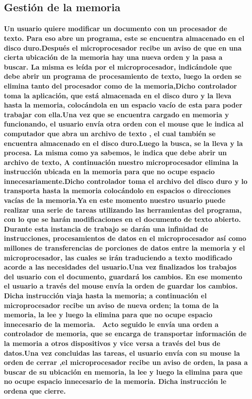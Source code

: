 \documentclass{article}
\begin{document}
\subsection{Gestión de la memoria}

\paragraph{Un usuario quiere modificar un documento con un procesador de texto. Para eso abre
un programa, este se encuentra almacenado en el disco duro.Después el microprocesador recibe un aviso de que en una cierta ubicación de la memoria hay una nueva orden y la pasa a buscar. La misma es leída por el microprocesador, indicándole que debe abrir un programa de procesamiento de texto, luego la orden se elimina tanto del procesador como de la memoria,Dicho controlador toma la aplicación, que está almacenada en el disco duro y la lleva hasta la memoria, colocándola en un espacio
vacío de esta para poder trabajar con ella.Una vez que se encuentra cargado en memoria y
funcionando, el usuario envía otra orden con el mouse que le indica al computador que abra
un archivo de texto , el cual también se encuentra almacenado en el disco duro.Luego la busca, se la lleva y la procesa. La misma como ya sabemos, le indica que debe abrir un archivo de texto, A continuación nuestro microprocesador elimina la instrucción ubicada en la memoria para
que no ocupe espacio innecesariamente.Dicho controlador toma el archivo del disco duro y lo transporta hasta la memoria colocándolo en espacios o direcciones vacías de la memoria.Ya en este momento nuestro usuario puede realizar una serie de tareas utilizando las
herramientas del programa, con lo que se harán modificaciones en el documento de
texto abierto. Durante esta instancia de trabajo se darán una infinidad de instrucciones,
procesamientos de datos en el microprocesador así como millones de transferencias de
porciones de datos entre la memoria y el microprocesador, las cuales se irán traduciendo a
texto modificado acorde a las necesidades del usuario.Una vez finalizados los trabajos del usuario con el documento, guardará los cambios. En ese
momento el usuario a través del mouse envía la orden de guardar los cambios. Dicha
instrucción viaja hasta la memoria; a continuación el microprocesador recibe un aviso de
nueva orden; la toma de la memoria, la lee y luego la elimina para que no ocupe espacio
innecesario de la memoria.
 Acto seguido le envía una orden a controlador de memoria, que se encarga de transportar
información de la memoria a otros dispositivos y vice versa a través del bus de datos.Una vez concluidas las tareas, el usuario envía con su mouse la orden de cerrar ,el microprocesador recibe un aviso de orden, la pasa a buscar de su ubicación en memoria,
la lee y luego la elimina para que no ocupe espacio innecesario de la memoria. Dicha
instrucción le ordena que cierre.\cite{taller}}
\end{document}
